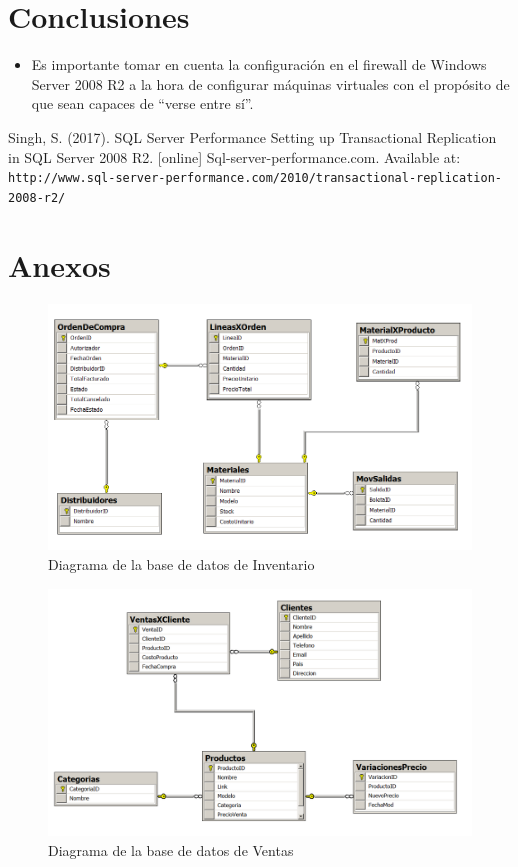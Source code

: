 \documentclass{article}
\begin{document}
\section{Conclusiones}
\begin{itemize}
  \item Es importante tomar en cuenta la configuraci\'on en el firewall de Windows Server 2008 R2 a la hora de configurar m\'aquinas virtuales con el prop\'osito de que sean capaces de ``verse entre s\'i''.
\end{itemize}

\begin{thebibliography}{99}
  Singh, S. (2017). SQL Server Performance Setting up Transactional Replication in SQL Server 2008 R2. [online] Sql-server-performance.com. Available at: \texttt{http://www.sql-server-performance.com/2010/transactional-replication-2008-r2/}
\end{thebibliography}

\section{Anexos}
\begin{figure}[!ht]
  \caption{Diagrama de la base de datos de Inventario}
  \centering
    \includegraphics[width=1\textwidth]{diagInv.PNG}
\end{figure}

\begin{figure}[!ht]
  \caption{Diagrama de la base de datos de Ventas}
  \centering
    \includegraphics[width=1\textwidth]{diagVentas.PNG}
\end{figure}
\end{document}
